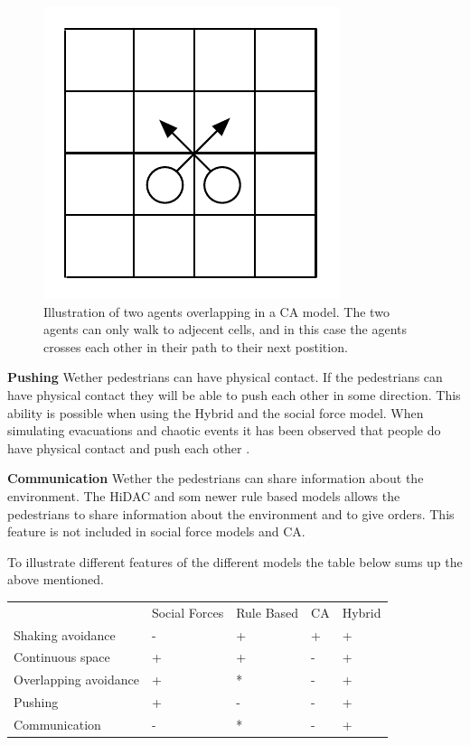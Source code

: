 \begin{figure}
    \centering
    \includegraphics[scale=0.55]{Figures/Overlapping.pdf} 
    \caption[Overlapping]{Illustration of two agents overlapping in a CA model. The two agents can only walk to adjecent cells, and in
	     this case the agents crosses each other in their path to their next postition.}
    \label{Overlapping}
\end{figure}

\textbf{Pushing} Wether pedestrians can have physical contact. If the pedestrians 
can have physical contact they will be able to push each other in some direction. 
This ability is possible when using the Hybrid and the social force model. When 
simulating evacuations and chaotic events it has been observed that people do have 
physical contact and push each other \cite{self-org}.

\textbf{Communication} Wether the pedestrians can share information about the 
environment. The HiDAC and som newer rule based models allows the pedestrians 
to share information about the environment and to give orders. This feature is 
not included in social force models and CA. \cite{Comparison}

To illustrate different features of the different models the table below sums 
up the above mentioned.

\begin{center}
\begin{tabular}{lllll}
 & Social Forces & Rule Based & CA & Hybrid\\
Shaking avoidance     & - & + & + & +\\
Continuous space      & + & + & - & +\\
Overlapping avoidance & + & * & - & +\\
Pushing               & + & - & - & +\\
Communication         & - & * & - & +
\end{tabular}
\end{center}

